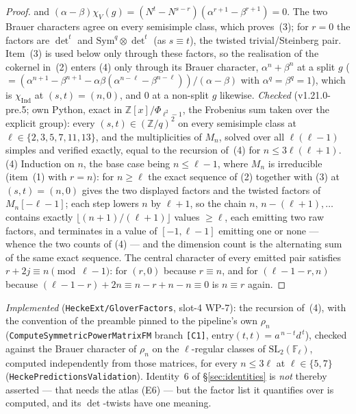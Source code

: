 \documentclass[11pt]{article}
\theoremstyle{remark}
\newcommand{\F}{\mathbb{F}}
\newcommand{\Z}{\mathbb{Z}}
\newcommand{\SL}{\mathrm{SL}}
\newcommand{\Sym}{\mathrm{Sym}}
\newcommand{\Fl}{\F_\ell}
\newcommand{\Mn}{M_n}
\begin{document}
\begin{proof}
and $(\alpha-\beta)\chi_V(g)=(N^{t}-N^{s-r})(\alpha^{r+1}-\beta^{r+1})=0$. The two Brauer characters agree on every semisimple class,
which proves~(3); for $r=0$ the factors are $\det^{t}$ and $\Sym^{q}\otimes\det^{t}$ (as $s\equiv t$), the twisted trivial/Steinberg pair.
Item~(3) is used below only through these factors, so the realisation of the cokernel in~(2) enters (4) only through its Brauer
character, $\alpha^{n}+\beta^{n}$ at a split $g$ ($=(\alpha^{n+1}-\beta^{n+1}-\alpha\beta(\alpha^{n-\ell}-\beta^{n-\ell}))/(\alpha-\beta)$ with $\alpha^{q}=\beta^{q}=1$), which is
$\chi_{\mathrm{Ind}}$ at $(s,t)=(n,0)$, and $0$ at a non-split $g$ likewise. \emph{Checked} (v1.21.0-pre.5; own Python, exact in $\Z[x]/\Phi_{\ell^2-1}$, the
Frobenius sum taken over the explicit group): every $(s,t)\in(\Z/q)^2$ on every semisimple class at $\ell\in\{2,3,5,7,11,13\}$, and the multiplicities of
$\Mn$, solved over all $\ell(\ell-1)$ simples and verified exactly, equal to the recursion of~(4) for $n\le3\ell(\ell+1)$.
(4) Induction on $n$, the base case being $n\le\ell-1$, where
$\Mn$ is irreducible (item~(1) with $r=n$): for $n\ge\ell$ the exact sequence of (2)
together with (3) at $(s,t)=(n,0)$ gives the two displayed factors and the twisted factors
of $\Mn[-\ell-1]$; each step lowers $n$ by $\ell+1$, so the chain
$n,\,n-(\ell+1),\dots$ contains exactly $\lfloor (n+1)/(\ell+1)\rfloor$ values $\ge\ell$,
each emitting two raw factors, and terminates in a value of $[-1,\ell-1]$ emitting one or
none --- whence the two counts of (4) --- and the dimension count is the alternating sum of the
same exact sequence. The central character of every emitted pair satisfies
$r+2j\equiv n\pmod{\ell-1}$: for $(r,0)$ because $r\equiv n$, and for $(\ell-1-r,n)$
because $(\ell-1-r)+2n\equiv n-r+n-n\equiv0$ is $n\equiv r$ again.
\end{proof}

\noindent\emph{Implemented} (\texttt{HeckeExt/GloverFactors}, slot-4 WP-7): the recursion
of~(4), with the convention of the preamble pinned to the pipeline's own $\rho_n$
(\texttt{ComputeSymmetricPowerMatrixFM} branch \texttt{[C1]},
$\mathrm{entry}(t,t)=a^{\,n-t}d^{\,t}$), checked against the Brauer character of $\rho_n$ on
the $\ell$-regular classes of $\SL_2(\Fl)$, computed independently from those matrices, for
every $n\le3\ell$ at $\ell\in\{5,7\}$ (\texttt{HeckePredictionsValidation}). Identity~6 of
\S\ref{sec:identities} is \emph{not} thereby asserted --- that needs the atlas (E6) --- but
the factor list it quantifies over is computed, and its $\det$-twists have one meaning.
\end{document}

